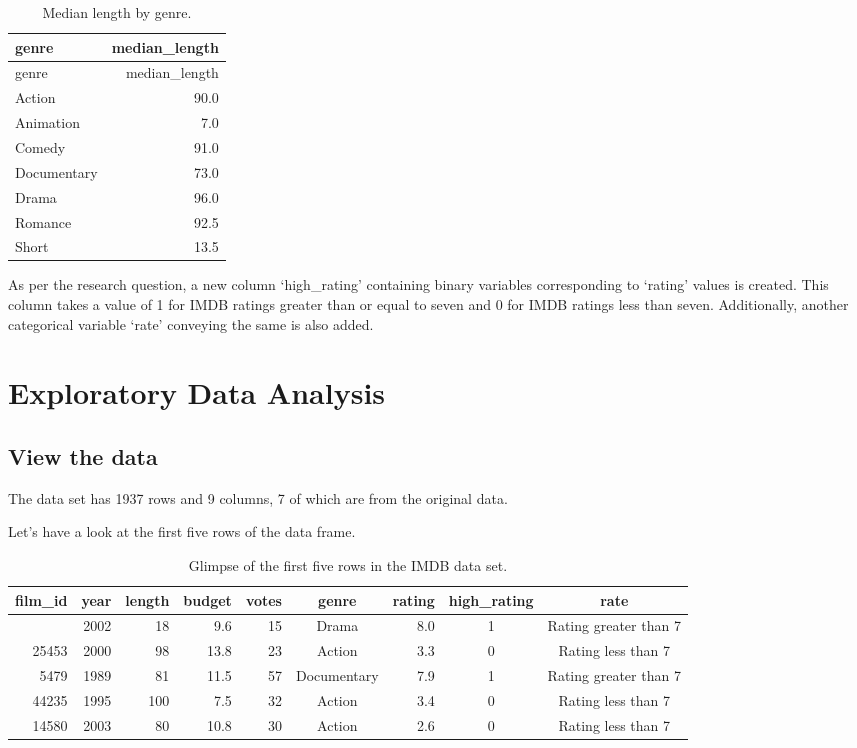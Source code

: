 \documentclass[
  letterpaper,
  DIV=11,
  numbers=noendperiod]{scrartcl}
\begin{document}
\hypertarget{tbl-median-length}{}
\begin{longtable}[]{@{}lr@{}}
\caption{\label{tbl-median-length}Median length by
genre.}\tabularnewline
\toprule\noalign{}
genre & median\_length \\
\midrule\noalign{}
\endfirsthead
\toprule\noalign{}
genre & median\_length \\
\midrule\noalign{}
\endhead
\bottomrule\noalign{}
\endlastfoot
Action & 90.0 \\
Animation & 7.0 \\
Comedy & 91.0 \\
Documentary & 73.0 \\
Drama & 96.0 \\
Romance & 92.5 \\
Short & 13.5 \\
\end{longtable}

As per the research question, a new column `high\_rating' containing
binary variables corresponding to `rating' values is created. This
column takes a value of 1 for IMDB ratings greater than or equal to
seven and 0 for IMDB ratings less than seven. Additionally, another
categorical variable `rate' conveying the same is also added.

\hypertarget{sec-EDA}{%
\section{Exploratory Data Analysis}\label{sec-EDA}}

\hypertarget{view-the-data}{%
\subsection{View the data}\label{view-the-data}}

The data set has 1937 rows and 9 columns, 7 of which are from the
original data.

Let's have a look at the first five rows of the data frame.

\hypertarget{tbl-glimpse-dataset}{}
\begin{longtable}{rrrrrcrcc}
\caption{\label{tbl-glimpse-dataset}Glimpse of the first five rows in the IMDB data set. }\tabularnewline

\toprule
film\_id & year & length & budget & votes & genre & rating & high\_rating & rate \\ 
\midrule\addlinespace[2.5pt]
31804 & 2002 & 18 & 9.6 & 15 & Drama & 8.0 & 1 & Rating greater than 7 \\ 
25453 & 2000 & 98 & 13.8 & 23 & Action & 3.3 & 0 & Rating less than 7 \\ 
5479 & 1989 & 81 & 11.5 & 57 & Documentary & 7.9 & 1 & Rating greater than 7 \\ 
44235 & 1995 & 100 & 7.5 & 32 & Action & 3.4 & 0 & Rating less than 7 \\ 
14580 & 2003 & 80 & 10.8 & 30 & Action & 2.6 & 0 & Rating less than 7 \\ 
\bottomrule
\end{longtable}
\end{document}
